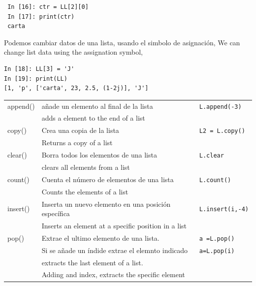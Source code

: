 \begin{center}
\begin{minipage}{0.3\textwidth}
 \begin{verbatim}
 In [16]: ctr = LL[2][0]
 In [17]: print(ctr)
 carta
\end{verbatim}
\end{minipage}
\end{center}
\begin{paracol}{2}
Podemos cambiar datos de una lista, usando el simbolo de asignación,
\switchcolumn
We can change list data using the assignation symbol,
\end{paracol}
\begin{center}
\begin{minipage}{0.5\textwidth}
\begin{verbatim}
In [18]: LL[3] = 'J'
In [19]: print(LL)
[1, 'p', ['carta', 23, 2.5, (1-2j)], 'J']
\end{verbatim}
\end{minipage}
\end{center}

\begin{table}
\centering
    \begin{tabular}{l l l}
    append() & añade un elemento al final de la lista & \texttt{L.append(-3)}\\
    & adds a element to the end of a list & \\
    \hline
    copy() & Crea una copia de la lista & \texttt{L2 = L.copy()}\\
    & Returns a copy of a list & \\
    \hline
     clear() & Borra todos los elementos de una lista & \texttt{L.clear}\\
     &clears all elements from a list&\\
     \hline
     count()& Cuenta el número de elementos de una lista & \texttt{L.count()}\\
     &Counts the elements of a list&\\
     \hline
     insert() & Inserta un nuevo elemento en una posición específica & \texttt{L.insert(i,-4)}\\
     &Inserts an element at a specific position in a list &\\
     \hline
     pop() & Extrae el ultimo elemento de una lista.  &\texttt{a =L.pop()}\\
     & Si se añade un índide extrae el elemnto indicado &\texttt{a=L.pop(i)}\\
     & extracts the last element of a list. &\\
     &Adding and index, extracts the specific element& \\
     \hline
    \end{tabular}
    \label{Tb:listas}
\end{table}


